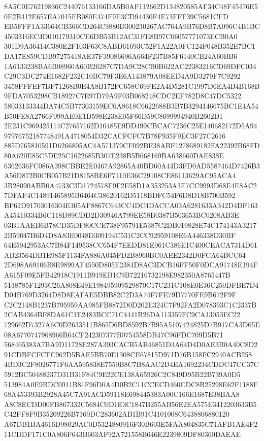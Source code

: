 \documentclass[UTF8,fontset=fandol,zihao=-4,a4paper]{ctexart}
\begin{document}
{{8A5C0E76219836C244076133166DA5B0AF112662D134820585AF34C48F45476E50E2B412E657EA7015EB080E474F9E3CD94430F4E73FFF39C5681CFD
EB5FFF1A33664CB366CD264C9880D300230267AC764A9B76D8B7A096C4B1BC4503316EC4D010179310CE6DB53B12AC31FE8B97C06057771073ECB0A0
301D9A36414C380E2F103F63C8ABD61693C52F1A22A0FC124F048B352E7BC1DA17E859CDB97275418AE37F39086696A664F237B85F6140CB24A60BB6
1A6133238BA6B08960A60B26287C7DA9C28CB0B622AC22383216CD69DFC034C29C3DC274E1682F232C10BC79F3E6A143879A08EED4A9D3279F7C9292
3458FFFEF7BF71268B0E4A8B172FC658C69FE2A4D5281C1997D6EA4B4B168B9FDA7053298CB18927C7E97D79A9F03B068248CDC2EF782D8C47DC5322
58033133344DA74C5B77303159EC6A8618C6622688B3B7B3294146675BC1E4A54B50FE8A2766F099AE0E1D598E238E05F66D59C8699994940B2602D1
2E231C969425114C27657162D10485E9DD499CBCAC7236C25E140682172D5A9497976752187748491A4718054D32CACFCFC7B78F935F9EC3F27C2616
885D765810591D6266805AC4A571379CF092BF38ABF1278689182FA22392B68FD80A620E85C5DE25C1622685B307E238B5B668169BA638660DAE838E
6362636FC086A398CBBE2E0467A92865A40BD60A44D3FD0AD5587464D7426B3A56D872B0CB057B21D8158BE6F7110E36C29108CE86113629AC95ACA4
3B28090ABB0A4733C3D1724578F9F2E58D1A353253A3E7CC9993D68E4E8AC27DFAF4C14891465895B6464C38620162D5118BDFC54F6D8D18B700B592
BF62D91703016304E305AF8867C643CC4DC4DACCA03A6281633A342D4DF163A45410334B6C118D89CDD2D30946A799EE58B0387B503653BC0208AB3E
03B1AAEB6B78CD35DF80CCE738F95791E5387C2DB019828E74C174143A32172B59047B6D4D8A83E0048D309194C531C2CC92959108E6A446338D30BF
64E5942953AC7B84F149538CC654F7EEDD81E061C386E1C400CEACA7314D61AB23564DB1E985F1134FA886A045FD2B8960BC0AEE2342D0FCA64BCC64
2D698A69106B8E9899AF4550D805E2384D8AC3DCB16FF50F0DCA91748E194FA615F09E5FB42918C1911B919EB1C9B72216732198E982350A8765447B
5138785F1293C26A808E49E198495909529870C17C231C108E0E36C250DFBE7D4D04B769D3264D8D8EAFAE5DBB82C2D3A74F7FE79D7770FE9B672F9F
C2C2148B1237B795959AA985FB8872D0D202E324C7F92FA2D078393C1C2337B2CAB4364BF8DA61C1E2483BCC71C4441B26DA113359FC9CA13053EC22
729662D7327A6C0D2633511B865D6BD8592B7B95A5107424825D7B917CA3D05E08A6770747968966B64CF242307377B0754558DB47C96FDC709D5B71
568465383A7BA9D11728E287A393CACB5AB46851D3A64D4D0AE3B0A40C8D291CDBFCFCFC962D5BAE5BB70E1308CE67815D971D76B158FC2940ACB258
4BD3C2F8026771F6AA595838E7550B8C7B8AAC2D4EA1692234CDDC47CC37C5912BC50488237D31B31F84C9E22CE138A65926C2C849D95B22B739A0D5
513984A0E9BDC0911B81F96D0A4D0B2C11CCECD460CDC8B25298E62F1188F68A453393B2928A45C7A91ACD59118E698445383A00C166E1687E38BAA8
A8C8ECDD00FB867332C5684C0D1E3C1847B255AB56E2EA575E3412203633B5C42FF8F9B35209226B7169DC283602AB1B91C4101008C6438806880120
A67DB1BA4616D98029AC0D5324880916F30B603E5FAA804835C71AFB1AE4F211CDDF171C0A806F643B603AF92A721558B646E2239809DF80360DAEAE
}}
\end{document}
